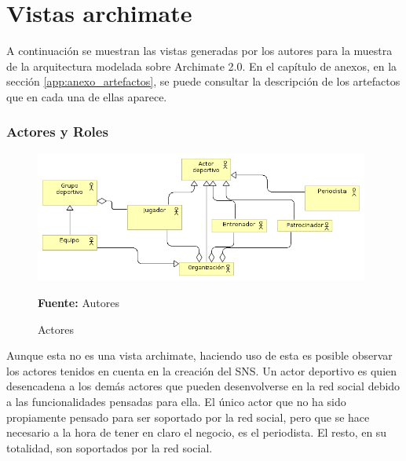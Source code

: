 \section{Vistas archimate}

A continuación se muestran las vistas generadas por los autores para la muestra de la arquitectura modelada sobre Archimate 2.0. En el capítulo de anexos, en la sección \ref{app:anexo_artefactos}, se puede consultar la descripción de los artefactos que en cada una de ellas aparece.

\subsubsection{Actores y Roles}

\begin{figure}[!htb]
  \begin{center}
    \includegraphics[width=11cm]{./imagenes/Archimate/vistas/generales/actores.png}
    \caption{Actores}
    \label{fig:Actores}
    \textbf{Fuente:}  Autores
  \end{center}
\end{figure}

Aunque esta no es una vista archimate, haciendo uso de esta es posible observar los actores tenidos en cuenta en la creación del SNS. Un actor deportivo es quien desencadena a los demás actores que pueden desenvolverse en la red social debido a las funcionalidades pensadas para ella. El único actor que no ha sido propiamente pensado para ser soportado por la red social, pero que se hace necesario a la hora de tener en claro el negocio, es el periodista. El resto, en su totalidad, son soportados por la red social.

